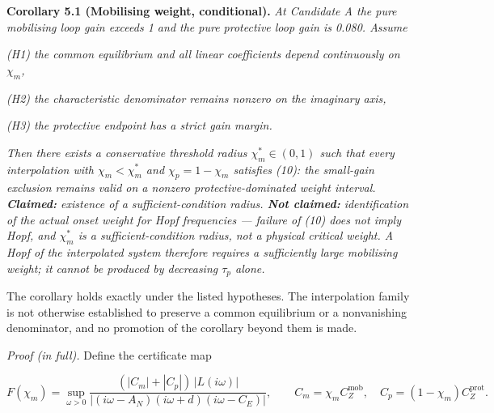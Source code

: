 \documentclass[11pt]{article}
\begin{document}
\textbf{Corollary 5.1 (Mobilising weight, conditional).} \emph{At
Candidate A the pure mobilising loop gain exceeds 1 and the pure
protective loop gain is 0.080. Assume}

\emph{(H1) the common equilibrium and all linear coefficients depend
continuously on \(\chi_m\),}

\emph{(H2) the characteristic denominator remains nonzero on the
imaginary axis,}

\emph{(H3) the protective endpoint has a strict gain margin.}

\emph{Then there exists a conservative threshold radius
\(\chi_m^* \in (0,1)\) such that every interpolation with
\(\chi_m < \chi_m^*\) and \(\chi_p = 1 - \chi_m\) satisfies (10): the
small-gain exclusion remains valid on a nonzero protective-dominated
weight interval. \textbf{Claimed:} existence of a sufficient-condition
radius. \textbf{Not claimed:} identification of the actual onset weight
for Hopf frequencies --- failure of (10) does not imply Hopf, and
\(\chi_m^*\) is a sufficient-condition radius, not a physical critical
weight. A Hopf of the interpolated system therefore requires a
sufficiently large mobilising weight; it cannot be produced by
decreasing \(\tau_p\) alone.}

The corollary holds exactly under the listed hypotheses. The
interpolation family is not otherwise established to preserve a common
equilibrium or a nonvanishing denominator, and no promotion of the
corollary beyond them is made.

\emph{Proof (in full).} Define the certificate map

\[F(\chi_m) = \sup_{\omega>0} \frac{(|C_m|+|C_p|)\,|L(i\omega)|}{|(i\omega-A_N)(i\omega+d)(i\omega-C_E)|}, \qquad C_m = \chi_m C_Z^{\mathrm{mob}}, \quad C_p = (1-\chi_m)C_Z^{\mathrm{prot}}.\]
\end{document}
